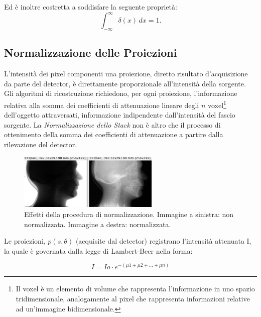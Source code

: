 \documentclass[a4paper,12pt, doubleside]{report}
\begin{document}
                    Ed è inoltre costretta a soddisfare la seguente proprietà:
                    \begin{equation}
                        \int_{-\infty}^\infty \delta(x) \, dx = 1.
                    \end{equation}
            
            \subsection{Normalizzazione delle Proiezioni}
                \par
                    L'intensità dei pixel componenti una proiezione, diretto risultato d'acquisizione da parte del detector, è direttamente proporzionale all'intensità della sorgente. Gli algoritmi di ricostruzione richiedono, per ogni proiezione, l'informazione relativa alla somma dei coefficienti di attenuazione lineare degli $n$ voxel\footnote{Il voxel è un elemento di volume che rappresenta l'informazione in uno spazio tridimensionale, analogamente al pixel che rappresenta informazioni relative ad un'immagine bidimensionale.} dell'oggetto attraversati, informazione indipendente dall'intensità del fascio sorgente. La \textit{Normalizzazione dello Stack} non è altro che il processo di ottenimento della somma dei coefficienti di attenuazione a partire dalla rilevazione del detector.
              
                    \begin{figure}[h]
                        \centering
                        \includegraphics[width=0.6\textwidth]{normalization}
                        \caption{Effetti della procedura di normalizzazione. Immagine a sinistra: non normalizzata. Immagine a destra: normalizzata.}
                        \label{fig:skull-phantom}
                    \end{figure}
                    
                    Le proiezioni, $p(s,\theta)$ (acquisite dal detector) registrano l'intensità attenuata I, la quale è governata dalla legge di Lambert-Beer \cite{lambert-beer} nella forma:
    
                    \begin{equation} \label{eq:lambert-beer}
                        I = Io \cdot e^{- (\mu1 + \mu2 + ...  + \mu n)}
                    \end{equation}
                    
\end{document}
